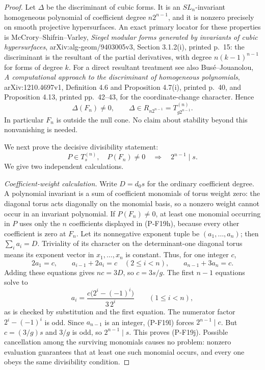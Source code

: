 \begin{proof}
Let $\Delta$ be the discriminant of cubic forms. It is an
$SL_n$-invariant homogeneous polynomial of coefficient degree
$n2^{n-1}$, and it is nonzero precisely on smooth projective
hypersurfaces. An exact primary locator for these properties is
McCrory--Shifrin--Varley, \emph{Siegel modular forms generated by
invariants of cubic hypersurfaces}, arXiv:alg-geom/9403005v3,
Section 3.1.2(i), printed p.~15: the discriminant is the resultant
of the partial derivatives, with degree $n(k-1)^{n-1}$ for forms
of degree $k$.
For a direct resultant treatment see also Bus\'e--Jouanolou,
\emph{A computational approach to the discriminant of homogeneous
polynomials}, arXiv:1210.4697v1, Definition 4.6 and
Proposition 4.7(i), printed p.~40, and Proposition 4.13,
printed pp.~42--43, for the coordinate-change character.
Hence
\[
 \Delta(F_n)\ne0,\qquad
 \Delta\in R_{n2^{n-1}}
      =T^{(n)}_{g2^{n-1}}.
 \tag{P-F19i}
\]
In particular $F_n$ is outside the null cone. No claim about
stability beyond this nonvanishing is needed.

We next prove the decisive divisibility statement:
\[
 P\in T^{(n)}_s,\quad P(F_n)\ne0
       \quad\Longrightarrow\quad 2^{n-1}\mid s.
 \tag{P-F19j}
\]
We give two independent calculations.

\emph{Coefficient-weight calculation.}
Write $D=d_0s$ for the ordinary coefficient degree. A polynomial
invariant is a sum of coefficient monomials of torus weight zero:
the diagonal torus acts diagonally on the monomial basis, so a
nonzero weight cannot occur in an invariant polynomial.
If $P(F_n)\ne0$, at least one monomial occurring in $P$ uses
only the $n$ coefficients displayed in (P-F19h), because every
other coefficient is zero at $F_n$. Let its nonnegative exponent
tuple be $(a_1,\ldots,a_n)$; then $\sum_i a_i=D$.
Triviality of its character on the determinant-one diagonal torus
means its exponent vector in $x_1,\ldots,x_n$ is constant.
Thus, for one integer $c$,
\[
 2a_1=c,\qquad
 a_{i-1}+2a_i=c\quad(2\le i<n),\qquad
 a_{n-1}+3a_n=c.
 \tag{P-F19k}
\]
Adding these equations gives $nc=3D$, so $c=3s/g$.
The first $n-1$ equations solve to
\[
 a_i=\frac{c\bigl(2^i-(-1)^i\bigr)}{3\,2^i}
       \qquad(1\le i<n),
 \tag{P-F19l}
\]
as is checked by substitution and the first equation.
The numerator factor $2^i-(-1)^i$ is odd. Since $a_{n-1}$
is an integer, (P-F19l) forces $2^{n-1}\mid c$.
But $c=(3/g)s$ and $3/g$ is odd, so $2^{n-1}\mid s$.
This proves (P-F19j). Possible cancellation among the surviving
monomials causes no problem: nonzero evaluation guarantees that
at least one such monomial occurs, and every one obeys the same
divisibility condition.


\end{proof}
